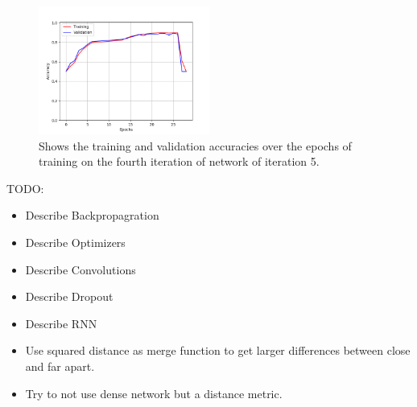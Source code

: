 \begin{figure}
    \centering
    \includegraphics[width=0.5\textwidth]{./pictures/experiments/network_5_accuracies.png}
    \caption{Shows the training and validation accuracies over the epochs of
        training on the fourth iteration of network of iteration 5.}
    \label{fig:network_5_accuracies}
\end{figure}


TODO:
\begin{itemize}
    \item Describe Backpropagration
    \item Describe Optimizers
    \item Describe Convolutions
    \item Describe Dropout
    \item Describe RNN
    \item Use squared distance as merge function to get larger differences
        between close and far apart.
    \item Try to not use dense network but a distance metric.
\end{itemize}
